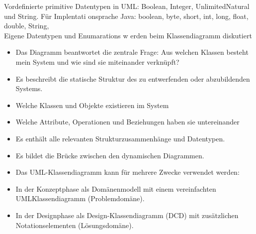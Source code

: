 \documentclass[10pt]{article}
\begin{document}
Vordefinierte primitive Datentypen in UML: Boolean, Integer, UnlimitedNatural und String. Für Implentati onsprache Java: boolean, byte, short, int, long, float, double, String,\\
Eigene Datentypen und Enumarations w erden beim Klassendiagramm diskutiert

\begin{itemize}
  \item Das Diagramm beantwortet die zentrale Frage: Aus welchen Klassen besteht mein System und wie sind sie miteinander verknüpft?
  \item Es beschreibt die statische Struktur des zu entwerfenden oder abzubildenden Systems.
  \item Welche Klassen und Objekte existieren im System
  \item Welche Attribute, Operationen und Beziehungen haben sie untereinander
  \item Es enthält alle relevanten Strukturzusammenhänge und Datentypen.
  \item Es bildet die Brücke zwischen den dynamischen Diagrammen.
  \item Das UML-Klassendiagramm kann für mehrere Zwecke verwendet werden:
  \item In der Konzeptphase als Domänenmodell mit einem vereinfachten UMLKlassendiagramm (Problemdomäne).
  \item In der Designphase als Design-Klassendiagramm (DCD) mit zusätzlichen Notationselementen (Lösungsdomäne).
\end{itemize}
\end{document}
